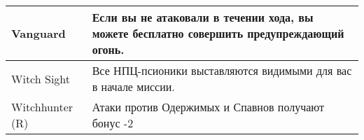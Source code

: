 \begin{table}[h]
\begin{tabularx}{\textwidth}{|l|X|}
        Vanguard           & Если вы не атаковали в течении хода, вы можете бесплатно совершить предупреждающий огонь.                                                                                                                                          \\ \hline
        Witch Sight        & Все НПЦ-псионики выставляются видимыми для вас в начале миссии.                                                                                                                                                                    \\ \hline
        Witchhunter (R)    & Атаки против Одержимых и Спавнов получают бонус -2                                                                                                                                                                                 \\ \hline
        \end{tabularx}
        \end{table}
